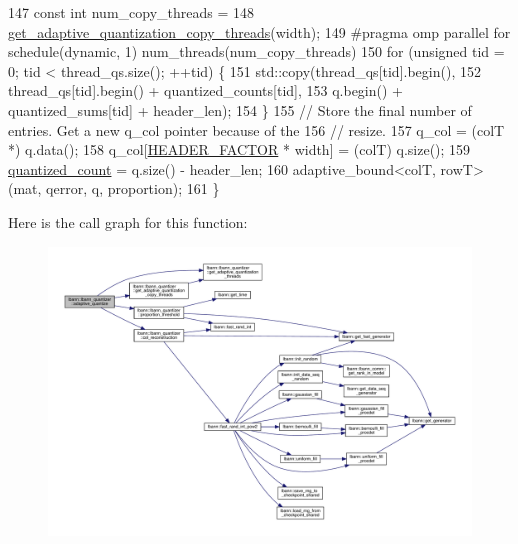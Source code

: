 \begin{DoxyCode}
147   \textcolor{keyword}{const} \textcolor{keywordtype}{int} num\_copy\_threads =
148     \hyperlink{classlbann_1_1lbann__quantizer_a22b898932caed41ccf24abcb67c00ba1}{get\_adaptive\_quantization\_copy\_threads}(width);
149 \textcolor{preprocessor}{  #pragma omp parallel for schedule(dynamic, 1) num\_threads(num\_copy\_threads)}
150   \textcolor{keywordflow}{for} (\textcolor{keywordtype}{unsigned} tid = 0; tid < thread\_qs.size(); ++tid) \{
151     std::copy(thread\_qs[tid].begin(),
152               thread\_qs[tid].begin() + quantized\_counts[tid],
153               q.begin() + quantized\_sums[tid] + header\_len);
154   \}
155   \textcolor{comment}{// Store the final number of entries. Get a new q\_col pointer because of the}
156   \textcolor{comment}{// resize.}
157   q\_col = (colT *) q.data();
158   q\_col[\hyperlink{classlbann_1_1lbann__quantizer_afb4315625e371169cabfac56c3f75d37}{HEADER\_FACTOR} * width] = (colT) q.size();
159   \hyperlink{classlbann_1_1lbann__quantizer_a716fae78ef5ba082a8093f0d06550804}{quantized\_count} = q.size() - header\_len;
160   adaptive\_bound<colT, rowT>(mat, qerror, q, proportion);
161 \}
\end{DoxyCode}
Here is the call graph for this function\+:\nopagebreak
\begin{figure}[H]
\begin{center}
\leavevmode
\includegraphics[width=350pt]{classlbann_1_1lbann__quantizer_a7e4dfca5770dfd88ae6255b0407d8f80_cgraph}
\end{center}
\end{figure}
\mbox{\label{classlbann_1_1lbann__quantizer_a737865bb555db8a8a104fb345f7626b2}} 
